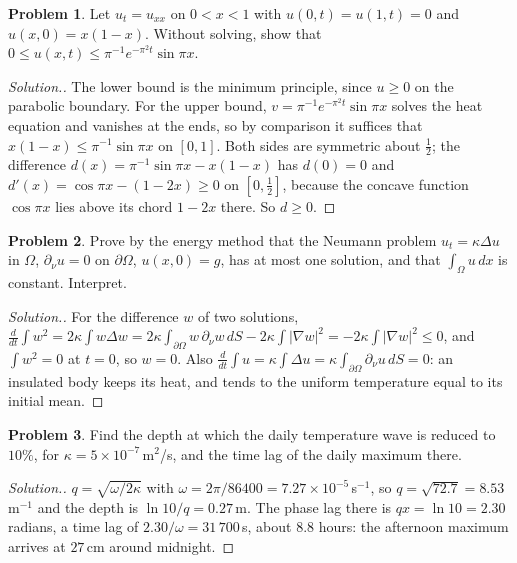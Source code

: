 \documentclass[11pt,a4paper]{article}
\numberwithin{equation}{section}
\theoremstyle{definition}
\newtheorem{problemx}{Problem}[subsection]
\newenvironment{problem}{\begin{problemx}}{\end{problemx}}
\newenvironment{solution}
  {\renewcommand{\qedsymbol}{}\begin{proof}[\textit{Solution}.]}
  {\end{proof}}
\begin{document}
\begin{problem}
\label{prob:compare}
Let $u_t = u_{xx}$ on $0 < x < 1$ with $u(0, t) = u(1, t) = 0$ and $u(x, 0) = x(1 - x)$. Without solving, show that $0 \leq u(x, t) \leq \pi^{-1}e^{-\pi^2t}\sin\pi x$.
\end{problem}

\begin{solution}
The lower bound is the minimum principle, since $u \geq 0$ on the parabolic boundary. For the upper bound, $v = \pi^{-1}e^{-\pi^2t}\sin\pi x$ solves the heat equation and vanishes at the ends, so by comparison it suffices that $x(1 - x) \leq \pi^{-1}\sin\pi x$ on $[0, 1]$. Both sides are symmetric about $\frac12$;
the difference $d(x) = \pi^{-1}\sin\pi x - x(1 - x)$ has $d(0) = 0$ and $d'(x) = \cos\pi x - (1 - 2x) \geq 0$ on $[0, \frac12]$, because the concave function $\cos\pi x$ lies above its chord $1 - 2x$ there. So $d \geq 0$.
\end{solution}

\begin{problem}
Prove by the energy method that the Neumann problem $u_t = \kappa\Delta u$ in $\Omega$, $\partial_\nu u = 0$ on $\partial\Omega$, $u(x, 0) = g$, has at most one solution, and that $\int_\Omega u\,dx$ is constant. Interpret.
\end{problem}

\begin{solution}
For the difference $w$ of two solutions, $\frac{d}{dt}\int w^2 = 2\kappa\int w\Delta w = 2\kappa\int_{\partial\Omega}w\,\partial_\nu w\,dS - 2\kappa\int|\nabla w|^2 = -2\kappa\int|\nabla w|^2 \leq 0$, and $\int w^2 = 0$ at $t = 0$, so $w = 0$. Also $\frac{d}{dt}\int u = \kappa\int\Delta u = \kappa\int_{\partial\Omega}\partial_\nu u\,dS = 0$: an insulated body keeps its heat, and tends to the uniform temperature equal to its initial mean.
\end{solution}

\begin{problem}
Find the depth at which the daily temperature wave is reduced to $10\%$, for $\kappa = 5 \times 10^{-7}$\,m$^2$/s, and the time lag of the daily maximum there.
\end{problem}

\begin{solution}
$q = \sqrt{\omega/2\kappa}$ with $\omega = 2\pi/86400 = 7.27 \times 10^{-5}$\,s$^{-1}$, so $q = \sqrt{72.7} = 8.53$\,m$^{-1}$ and the depth is $\ln 10/q = 0.27$\,m. The phase lag there is $qx = \ln 10 = 2.30$ radians, a time lag of $2.30/\omega = 31\,700$\,s, about $8.8$ hours: the afternoon maximum arrives at $27$\,cm around midnight.
\end{solution}
\end{document}
